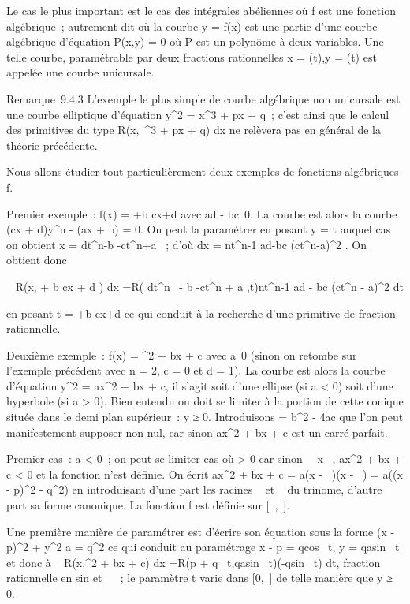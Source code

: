\documentclass[]{article}
\begin{document}
Le cas le plus important est le cas des intégrales abéliennes où f est
une fonction algébrique~; autrement dit où la courbe y = f(x) est une
partie d'une courbe algébrique \Gamma d'équation P(x,y) = 0 où P est un
polynôme à deux variables. Une telle courbe, paramétrable par deux
fractions rationnelles x = \phi(t),y = \psi(t) est appelée une courbe
unicursale.

Remarque~9.4.3 L'exemple le plus simple de courbe algébrique non
unicursale est une courbe elliptique d'équation y^2 =
x^3 + px + q~; c'est ainsi que le calcul des primitives du
type \int  R(x,\sqrtx~^3
 + px + q) dx ne relèvera pas en général de la théorie précédente.

Nous allons étudier tout particulièrement deux exemples de fonctions
algébriques f.

Premier exemple~: f(x) = \rootn
\ofax+b \over cx+d  avec ad -
bc\neq~0. La courbe \Gamma est alors la courbe (cx +
d)y^n - (ax + b) = 0. On peut la paramétrer en posant y = t
auquel cas on obtient x = dt^n-b \over
-ct^n+a ~; d'où dx = nt^n-1 ad-bc
\over (ct^n-a)^2 . On obtient
donc

\int ~ R(x,\rootn
\ofax + b \over cx + d ) dx
=\int  R( dt^n~ - b
\over -ct^n + a ,t)nt^n-1 ad -
bc \over (ct^n - a)^2 dt

en posant t = \rootn \ofax+b
\over cx+d  ce qui conduit à la recherche d'une
primitive de fraction rationnelle.

Deuxième exemple~: f(x) = \sqrtax^2  + bx +
c avec a\neq~0 (sinon on retombe sur l'exemple
précédent avec n = 2, c = 0 et d = 1). La courbe \Gamma est alors la courbe
d'équation y^2 = ax^2 + bx + c, il s'agit soit
d'une ellipse (si a \textless{} 0) soit d'une hyperbole (si a
\textgreater{} 0). Bien entendu on doit se limiter à la portion de cette
conique située dans le demi plan supérieur~: y ≥ 0. Introduisons \Delta =
b^2 - 4ac que l'on peut manifestement supposer non nul, car
sinon ax^2 + bx + c est un carré parfait.

Premier cas~: a \textless{} 0~; on peut se limiter cas où \Delta
\textgreater{} 0 car sinon \forall~~x \in {}~,
ax^2 + bx + c \textless{} 0 et la fonction n'est \jmathamais
définie. On écrit ax^2 + bx + c = a(x - \alpha~)(x - \beta~) = a((x -
p)^2 - q^2) en introduisant d'une part les racines \alpha~
et \beta~ du trinome, d'autre part sa forme canonique. La fonction f est
définie sur {[}\alpha~,\beta~{]}.

Une première manière de paramétrer \Gamma est d'écrire son équation sous la
forme (x - p)^2 + y^2 \over
\textbar{}a\textbar{} = q^2 ce qui conduit au paramétrage x
- p = qcos~ t, y =
q\sqrt\textbar{}a\textbar{}sin~
t et donc à \int ~
R(x,\sqrtax^2  + bx + c) dx
=\int  R(p + q\cos~
t,q\sqrt\textbar{}a\textbar{}sin~
t)(-qsin~ t) dt, fraction rationnelle en
sin et \cos~ ~; le
paramètre t varie dans {[}0,\pi~{]} de telle manière que y ≥ 0.
\end{document}
